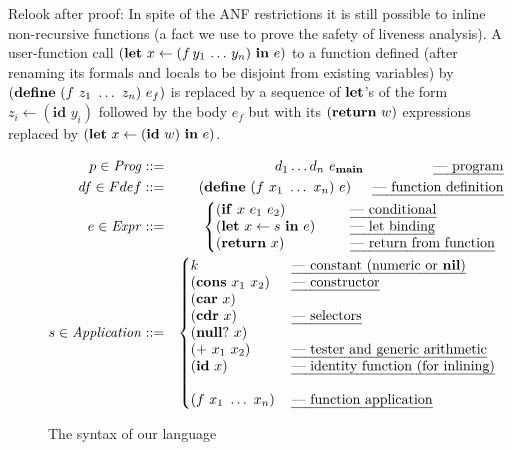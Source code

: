 \documentclass[9pt]{sigplanconf}
\newcommand{\ID}{\mbox{$\mathbf{ id}$}}
\begin{document}
{ \color {Myblue} Relook after proof: In spite of the  ANF restrictions
it
  is still possible  to inline non-recursive functions (a  fact we use
  to  prove the safety  of liveness  analysis).  A  user-function call
  $(\mbox{$\mathbf{ let}$}\,\, x \leftarrow (f\,y_1\,\ldots\,y_n)  \,\, \mbox{$\mathbf{ in}$}\,\, e)$ to a
  function  defined  (after renaming  its  formals  and  locals to  be
  disjoint         from         existing         variables)         by
  $(\mbox{$\mathbf{define}$}\ (f\ z_1\ \ldots\ z_n)\ e_f)$ is replaced by a sequence of
  $\mbox{$\mathbf{ let}$}$'s of  the form  $z_i\leftarrow (\ID\,\,y_i)$ followed  by the
  body $e_f$  but with  its $(\mbox{$\mathbf{ return}$}\,\,w)$ expressions  replaced by
  $(\LET\,\, x \leftarrow (\ID\,\, w) \,\, \IN\,\, e)$.}

\begin{figure}[t]
\footnotesize
\begin{eqnarray*}
   p \in \mathit{Prog} & ::= & d_1 \ldots d_n \,\, e_\mainpgm
    \hspace{5em} \mbox{\em --- program}\\
    \mathit{df} \in Fdef & ::= & (\DEFINE\,\, (f\,\, x_1 \,\, \ldots
\,\,x_n)\,\,
    e)
    \hspace{0.2em} \ \ \ \ \mbox{\em --- function definition} \\
e \in \mathit{Expr} & ::= &
\left\{\begin{array}{@{}ll@{\hspace{2em}}l}
       (\SIF\,\, x\,\, e_1\,\, e_2) && \!\!\!\mbox{\em --- conditional} \\
       (\LET\,\, x \leftarrow s\,\, \IN\,\, e) &&\!\!\! \mbox{\em --- let
binding} \\
       (\SRETURN\,\, x) && \!\!\!\mbox{\em --- return from function}
    \end{array}\right. \\
s \in \mathit{Application} & ::= &
\left\{\begin{array}{@{}l@{\hspace{1.2em}}l}
       k & \mbox{\em --- constant (numeric or $\NIL$)}\\
       (\CONS\,\, x_1\,\, x_2) & \mbox{\em --- constructor} \\
       (\CAR\,\, x) & \\
       (\CDR\,\, x) & \mbox{\em --- selectors} \\
       (\NULLQ\,\, x) & \\
       (\PRIM\,\, x_1\,\, x_2) & \mbox{\em ---  tester
and generic arithmetic} \\
       (\ID\,\, x) & \mbox{\em ---  identity function (for inlining)} \\
\\
       (f\,\, x_1\,\,\ldots\,\, x_n) & \mbox{\em --- function application}
    \end{array}\right.
\end{eqnarray*}
  \caption{The syntax of our language}\label{fig:lang-syntax}
\figrule
\normalsize
\end{figure}
\end{document}
